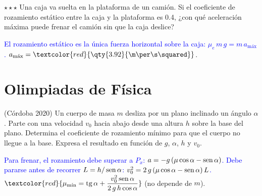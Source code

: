 \begin{exercise}
    \(\star\star\star\) Una caja va suelta en la plataforma de un camión. Si el coeficiente de rozamiento estático entre la caja y la
    plataforma es \num{0.4}, ¿con qué aceleración máxima puede frenar el camión sin que la caja deslice?
    \begin{solu}
        \textcolor{blue}{El rozamiento estático es la única fuerza horizontal sobre la caja: \(\mu_e\,m\,g = m\,a_{\text{máx}}\).}
        \(a_{\text{máx}} = \textcolor{red}{\qty{3.92}{\m\per\s\squared}}\).
    \end{solu}
\end{exercise}

\section{Olimpiadas de Física}\label{sec:ud11-olimpiadas}

\begin{exercise}
    (Córdoba 2020) Un cuerpo de masa \(m\) desliza por un plano inclinado un ángulo \(\alpha\). Parte con una velocidad \(v_0\) hacia abajo
    desde una altura \(h\) sobre la base del plano. Determina el coeficiente de rozamiento mínimo para que el cuerpo no llegue a la base.
    Expresa el resultado en función de \(g\), \(\alpha\), \(h\) y \(v_0\).
    \begin{solu}
        \textcolor{blue}{Para frenar, el rozamiento debe superar a \(P_x\): \(a = -g\,(\mu\cos\alpha - \operatorname{sen}\alpha)\). Debe pararse antes de
        recorrer \(L = h/\operatorname{sen}\alpha\): \(v_0^2 = 2\,g\,(\mu\cos\alpha - \operatorname{sen}\alpha)\,L\).}
        \(\textcolor{red}{\mu_{\text{mín}} = \tg\alpha + \dfrac{v_0^2\sen\alpha}{2\,g\,h\cos\alpha}}\) (no depende de \(m\)).
    \end{solu}
\end{exercise}

